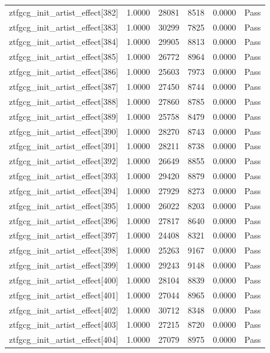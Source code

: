 \begin{table}[htbp]
\begin{tabular}{llrrll}
ztfgcg\_init\_artist\_effect[382] & 1.0000 & 28081 & 8518 & 0.0000 & Pass \\
ztfgcg\_init\_artist\_effect[383] & 1.0000 & 30299 & 7825 & 0.0000 & Pass \\
ztfgcg\_init\_artist\_effect[384] & 1.0000 & 29905 & 8813 & 0.0000 & Pass \\
ztfgcg\_init\_artist\_effect[385] & 1.0000 & 26772 & 8964 & 0.0000 & Pass \\
ztfgcg\_init\_artist\_effect[386] & 1.0000 & 25603 & 7973 & 0.0000 & Pass \\
ztfgcg\_init\_artist\_effect[387] & 1.0000 & 27450 & 8744 & 0.0000 & Pass \\
ztfgcg\_init\_artist\_effect[388] & 1.0000 & 27860 & 8785 & 0.0000 & Pass \\
ztfgcg\_init\_artist\_effect[389] & 1.0000 & 25758 & 8479 & 0.0000 & Pass \\
ztfgcg\_init\_artist\_effect[390] & 1.0000 & 28270 & 8743 & 0.0000 & Pass \\
ztfgcg\_init\_artist\_effect[391] & 1.0000 & 28211 & 8738 & 0.0000 & Pass \\
ztfgcg\_init\_artist\_effect[392] & 1.0000 & 26649 & 8855 & 0.0000 & Pass \\
ztfgcg\_init\_artist\_effect[393] & 1.0000 & 29420 & 8879 & 0.0000 & Pass \\
ztfgcg\_init\_artist\_effect[394] & 1.0000 & 27929 & 8273 & 0.0000 & Pass \\
ztfgcg\_init\_artist\_effect[395] & 1.0000 & 26022 & 8203 & 0.0000 & Pass \\
ztfgcg\_init\_artist\_effect[396] & 1.0000 & 27817 & 8640 & 0.0000 & Pass \\
ztfgcg\_init\_artist\_effect[397] & 1.0000 & 24408 & 8321 & 0.0000 & Pass \\
ztfgcg\_init\_artist\_effect[398] & 1.0000 & 25263 & 9167 & 0.0000 & Pass \\
ztfgcg\_init\_artist\_effect[399] & 1.0000 & 29243 & 9148 & 0.0000 & Pass \\
ztfgcg\_init\_artist\_effect[400] & 1.0000 & 28104 & 8839 & 0.0000 & Pass \\
ztfgcg\_init\_artist\_effect[401] & 1.0000 & 27044 & 8965 & 0.0000 & Pass \\
ztfgcg\_init\_artist\_effect[402] & 1.0000 & 30712 & 8348 & 0.0000 & Pass \\
ztfgcg\_init\_artist\_effect[403] & 1.0000 & 27215 & 8720 & 0.0000 & Pass \\
ztfgcg\_init\_artist\_effect[404] & 1.0000 & 27079 & 8975 & 0.0000 & Pass \\

\end{tabular}
\end{table}
